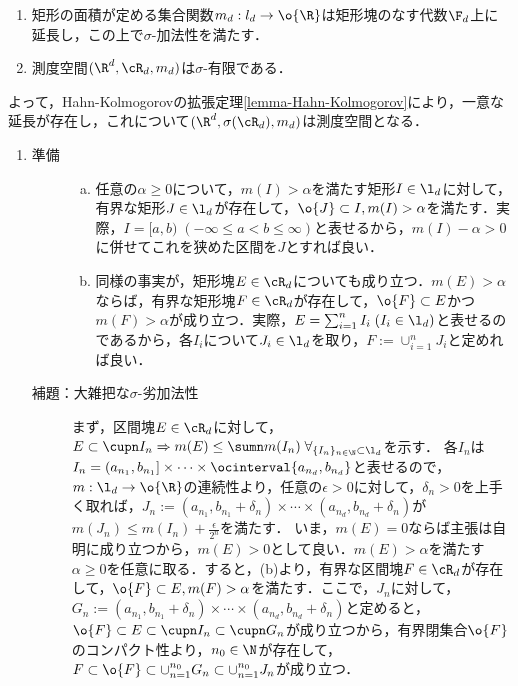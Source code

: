 \documentclass[uplatex, dvipdfmx]{jsreport}
\begin{document}
\begin{lemma}[Lebesgue測度の存在と一意性]\mbox{}\label{lemma-Lebesgue-measure}
    \begin{enumerate}
        \item 矩形の面積が定める集合関数$m_d:l_d\to\o{\R}$は矩形塊のなす代数$\F_d$上に延長し，この上で$\sigma$-加法性を満たす．
        \item 測度空間$(\R^d,\cR_d,m_d)$は$\sigma$-有限である．
    \end{enumerate}
    よって，Hahn-Kolmogorovの拡張定理\ref{lemma-Hahn-Kolmogorov}により，一意な延長が存在し，これについて$(\R^d,\sigma(\cR_d),m_d)$は測度空間となる．
\end{lemma}
\begin{Proof}\mbox{}
    \begin{enumerate}
        \item \begin{description}
            \item[準備] \begin{enumerate}[(a)]
                \item 任意の$\alpha\ge 0$について，$m(I)>\alpha$を満たす矩形$I\in\l_d$に対して，有界な矩形$J\in\l_d$が存在して，$\o{J}\subset I,m(I)>\alpha$を満たす．実際，$I=[a,b)\;(-\infty\le a<b\le\infty)$と表せるから，$m(I)-\alpha>0$に併せてこれを狭めた区間を$J$とすれば良い．
                \item 同様の事実が，矩形塊$E\in\cR_d$についても成り立つ．$m(E)>\alpha$ならば，有界な矩形塊$F\in\cR_d$が存在して，$\o{F}\subset E$かつ$m(F)>\alpha$が成り立つ．実際，$E=\sum^n_{i=1}I_i\;(I_i\in\l_d)$と表せるのであるから，各$I_i$について$J_i\in\l_d$を取り，$F:=\cup_{i=1}^nJ_i$と定めれば良い．
            \end{enumerate}
            \item[補題：大雑把な$\sigma$-劣加法性] まず，区間塊$E\in\cR_d$に対して，$E\subset\cupn I_n\Rightarrow m(E)\le\sumn m(I_n)\;\forall_{\{I_n\}_{n\in\N}\subset\l_d}$を示す．
            各$I_n$は$I_n=(a_{n_1},b_{n_1}]\times\cdots\times\ocinterval{a_{n_d},b_{n_d}}$と表せるので，$m:\l_d\to\o{\R}$の連続性より，任意の$\epsilon>0$に対して，$\delta_n>0$を上手く取れば，$J_n:=(a_{n_1},b_{n_1}+\delta_n)\times\cdots\times(a_{n_d},b_{n_d}+\delta_n)$が$m(J_n)\le m(I_n)+\frac{\epsilon}{2^n}$を満たす．
            いま，$m(E)=0$ならば主張は自明に成り立つから，$m(E)>0$として良い．$m(E)>\alpha$を満たす$\alpha\ge 0$を任意に取る．すると，(b)より，有界な区間塊$F\in\cR_d$が存在して，$\o{F}\subset E,m(F)>\alpha$を満たす．ここで，$J_n$に対して，$G_n:=(a_{n_1},b_{n_1}+\delta_n)\times\cdots\times(a_{n_d},b_{n_d}+\delta_n)$と定めると，$\o{F}\subset E\subset\cupn I_n\subset\cupn G_n$が成り立つから，有界閉集合$\o{F}$のコンパクト性より，$n_0\in\N$が存在して，$F\subset\o{F}\subset\cup_{n=1}^{n_0}G_n\subset\cup_{n=1}^{n_0}J_n$が成り立つ．

\end{description}
\end{enumerate}
\end{Proof}
\end{document}

